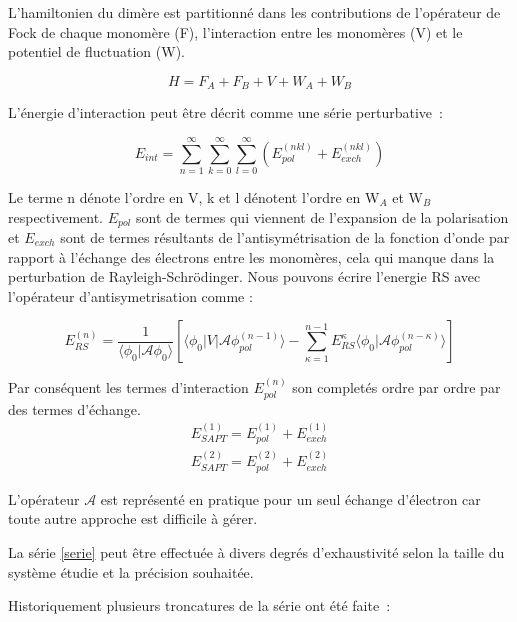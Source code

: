 L’hamiltonien du dimère est partitionné dans les contributions de l’opérateur de Fock de chaque monomère (F), l’interaction entre les monomères (V) et le potentiel de fluctuation (W).

\begin{equation}
H = F_{A} + F_{B} + V + W_{A} + W_{B}
\end{equation}

L’énergie d’interaction peut être décrit comme une série perturbative :

\begin{equation}
E_{int} = \sum_{n=1}^{\infty} \sum_{k=0}^{\infty} \sum_{l=0}^{\infty} (E_{pol}^{(nkl)}+ E_{exch}^{(nkl)}) \label{serie}
\end{equation}

Le terme n dénote l’ordre en V, k et l dénotent l’ordre en W$_{A}$ et W$_{B}$ respectivement. $E_{pol}$ sont de termes qui viennent de l’expansion de la polarisation et $E_{exch}$ sont de termes résultants de l’antisymétrisation de la fonction d’onde par rapport à l’échange des électrons entre les monomères, cela qui manque dans la perturbation de Rayleigh-Schr\"{o}dinger. Nous pouvons écrire l'energie RS avec l'opérateur d'antisymetrisation comme :

\begin{equation}
E_{RS}^{(n)} = \frac{1}{\langle\phi_{0}|\mathscr{A}\phi_{0}\rangle} \left[\langle\phi_{0} | V| \mathscr{A} \phi_{pol}^{(n-1)}\rangle - \sum_{\kappa=1}^{n-1} E_{RS}^{\kappa} \langle \phi_{0}|\mathscr{A} \phi_{pol}^{(n-\kappa)}\rangle\right]
\end{equation}

Par conséquent les termes d'interaction $E_{pol}^{(n)}$ son completés ordre par ordre par des termes d'échange. 
\begin{equation}
\begin{split}
E_{SAPT}^{(1)} = E_{pol}^{(1)} + E_{exch}^{(1)}\\
E_{SAPT}^{(2)} = E_{pol}^{(2)} + E_{exch}^{(2)}
\end{split}
\end{equation}

L'opérateur $\mathscr{A}$ est représenté en pratique pour un seul échange d'électron car toute autre approche est difficile à gérer.

La série \ref{serie} peut être effectuée à divers degrés d’exhaustivité selon la taille du système étudie et la précision souhaitée.  

Historiquement plusieurs troncatures de la série ont été faite :

